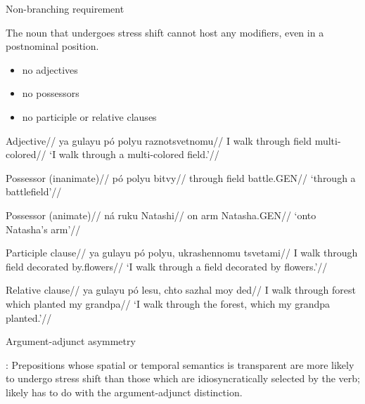 \documentclass{beamer}
\begin{document}
	\begin{frame}{Non-branching requirement}

		The noun that undergoes stress shift cannot host any modifiers, even in a postnominal position.
		
		\begin{itemize}
			\item no adjectives
			\item no possessors
			\item no participle or relative clauses
		\end{itemize}

	\end{frame}

	\begin{frame}
	
		\ex
			\begingl 
				\glpreamble Adjective//
				\gla *ya gulayu pó polyu raznotsvetnomu//
				\glb I walk through field multi-colored//
				\glft `I walk through a multi-colored field.'//
			\endgl
		\xe

	\end{frame}
	
	\begin{frame}
	
		\ex
			\begingl 
				\glpreamble Possessor (inanimate)//
				\gla *pó polyu bitvy//
				\glb through field battle.GEN//
				\glft `through a battlefield'//
			\endgl
		\xe
		
		\ex
			\begingl 
				\glpreamble Possessor (animate)//
				\gla *ná ruku Natashi//
				\glb on arm Natasha.GEN//
				\glft `onto Natasha's arm'//
			\endgl
		\xe


	\end{frame}

	\begin{frame}
	
		\ex
			\begingl 
				\glpreamble Participle clause//
				\gla *ya gulayu pó polyu, ukrashennomu tsvetami//
				\glb I walk through field decorated by.flowers//
				\glft `I walk through a field decorated by flowers.'//
			\endgl
		\xe
		
		\ex
			\begingl 
				\glpreamble Relative clause//
				\gla *ya gulayu pó lesu, chto sazhal moy ded//
				\glb I walk through forest which planted my grandpa//
				\glft `I walk through the forest, which my grandpa planted.'//
			\endgl
		\xe

	\end{frame}
	
	\begin{frame}{Argument-adjunct asymmetry}

		\textcite{Blumenfeld:2011}: Prepositions whose spatial or temporal semantics is transparent are
more likely to undergo stress shift than those which are idiosyncratically selected by the verb; likely has to do with the argument-adjunct distinction.

	\end{frame}
\end{document}
